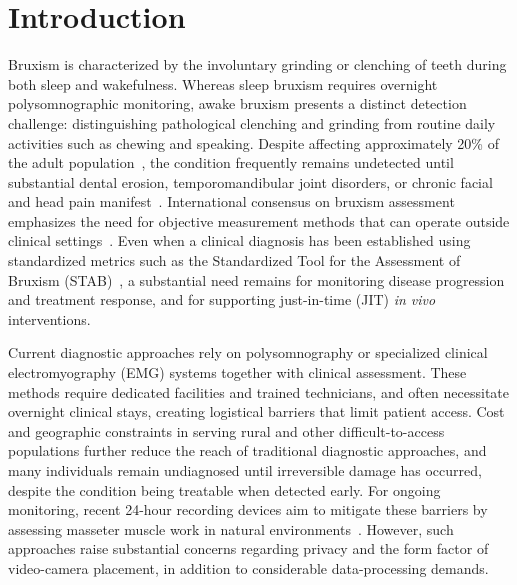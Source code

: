 \documentclass[pdflatex,sn-nature,iicol]{sn-jnl}
\begin{document}

\maketitle


\section{Introduction}

Bruxism is characterized by the involuntary grinding or clenching of teeth during both sleep and wakefulness. Whereas sleep bruxism requires overnight polysomnographic monitoring, awake bruxism presents a distinct detection challenge: distinguishing pathological clenching and grinding from routine daily activities such as chewing and speaking. Despite affecting approximately 20\% of the adult population~\cite{manfredini2013epidemiology}, the condition frequently remains undetected until substantial dental erosion, temporomandibular joint disorders, or chronic facial and head pain manifest~\cite{lavigne2008bruxism}. International consensus on bruxism assessment emphasizes the need for objective measurement methods that can operate outside clinical settings~\cite{lobbezoo2018international}. Even when a clinical diagnosis has been established using standardized metrics such as the Standardized Tool for the Assessment of Bruxism (STAB)~\cite{manfredini2024standardised}, a substantial need remains for monitoring disease progression and treatment response, and for supporting just-in-time (JIT) \textit{in vivo} interventions.

Current diagnostic approaches rely on polysomnography or specialized clinical electromyography (EMG) systems together with clinical assessment. These methods require dedicated facilities and trained technicians, and often necessitate overnight clinical stays, creating logistical barriers that limit patient access. Cost and geographic constraints in serving rural and other difficult-to-access populations further reduce the reach of traditional diagnostic approaches, and many individuals remain undiagnosed until irreversible damage has occurred, despite the condition being treatable when detected early. For ongoing monitoring, recent 24-hour recording devices aim to mitigate these barriers by assessing masseter muscle work in natural environments~\cite{colonna2023electromyographic}. However, such approaches raise substantial concerns regarding privacy and the form factor of video-camera placement, in addition to considerable data-processing demands.
\end{document}
